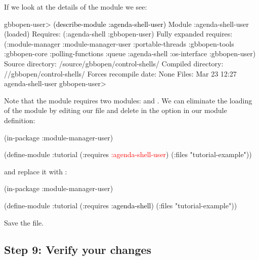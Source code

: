 \documentclass[10pt,twoside,english,pdftex]{article}
\begin{document}
If we look at the details of the  module we
see:
%
\W\supp
\begin{example}
\textcolor{darkergray}{%
  gbbopen-user> \textcolor{black}{(describe-module :agenda-shell-user)}
  Module :agenda-shell-user (loaded)
    Requires: (:agenda-shell :gbbopen-user)
    Fully expanded requires: (:module-manager :module-manager-user :portable-threads
                              :gbbopen-tools :gbbopen-core :polling-functions
                              :queue :agenda-shell :os-interface :gbbopen-user)
    Source directory: /source/gbbopen/control-shells/
    Compiled directory: //gbbopen/control-shells/
    Forces recompile date: None
    Files:   Mar 23 12:27  agenda-shell-user 
  gbbopen-user>}
\end{example}
%
Note that the  module requires two modules:
 and . We can eliminate
the loading of the  module by editing our
 file and delete  in
the  option in our  module definition:
%
\W\supp\notpretop
\begin{example}
\textcolor{darkergray}{%
  (in-package :module-manager-user)

  (define-module :tutorial
    (:requires \textcolor{red}{:agenda-shell-user})
    (:files "tutorial-example"))}
\end{example}
%
and replace it with :
%
\W\supp\notpretop
\begin{example}
\textcolor{darkergray}{%
  (in-package :module-manager-user)

  (define-module :tutorial
    (:requires \textcolor{black}{:agenda-shell})
    (:files "tutorial-example"))}
\end{example}
%
Save the file.

\subsection*{Step 9: Verify your changes}
\end{document}
